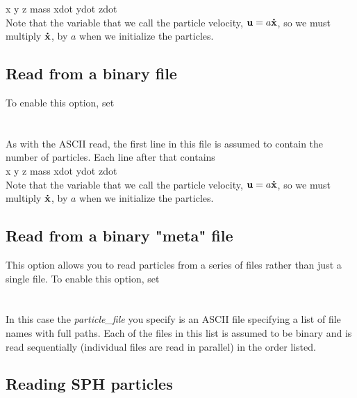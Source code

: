 x y z mass xdot ydot zdot \\

Note that the variable that we call the particle velocity, ${\mathbf u} = a {\bf \dot{x}}$, 
so we must multiply ${\bf \dot{x}}$, by $a$ when we initialize the particles.

\subsection{Read from a binary file}

To enable this option, set \\

 \\
 \\

As with the ASCII read, the first line in this file is
assumed to contain the number of particles.  Each line after that contains  \\

x y z mass xdot ydot zdot \\

Note that the variable that we call the particle velocity, ${\mathbf u} = a {\bf \dot{x}}$, 
so we must multiply ${\bf \dot{x}}$, by $a$ when we initialize the particles.

\subsection{Read from a binary "meta" file}

This option allows you to read particles from a series of files rather than 
just a single file.   To enable this option, set \\

 \\
 \\

In this case the {\em particle\_file} you specify is an ASCII file specifying a
list of file names with full paths.   Each of the files in this list is assumed
to be binary and is read sequentially (individual files are read in parallel) in 
the order listed.

\subsection{Reading SPH particles}

